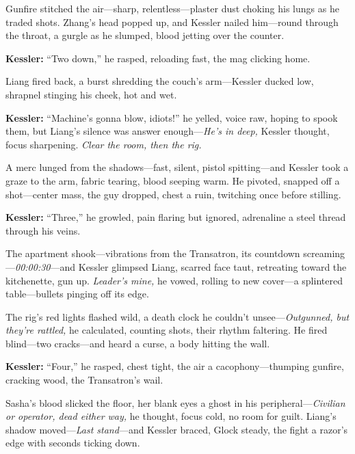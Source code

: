 \documentclass[12pt]{book}
\begin{document}
Gunfire stitched the air—sharp, relentless—plaster dust choking his lungs as he traded shots. Zhang’s head popped up, and Kessler nailed him—round through the throat, a gurgle as he slumped, blood jetting over the counter. 

\vspace{0.5em}
\textbf{Kessler:} “Two down,” he rasped, reloading fast, the mag clicking home.

Liang fired back, a burst shredding the couch’s arm—Kessler ducked low, shrapnel stinging his cheek, hot and wet. 

\vspace{0.5em}
\textbf{Kessler:} “Machine’s gonna blow, idiots!” he yelled, voice raw, hoping to spook them, but Liang’s silence was answer enough—\emph{He’s in deep,} Kessler thought, focus sharpening. \emph{Clear the room, then the rig.}

A merc lunged from the shadows—fast, silent, pistol spitting—and Kessler took a graze to the arm, fabric tearing, blood seeping warm. He pivoted, snapped off a shot—center mass, the guy dropped, chest a ruin, twitching once before stilling. 

\vspace{0.5em}
\textbf{Kessler:} “Three,” he growled, pain flaring but ignored, adrenaline a steel thread through his veins.

The apartment shook—vibrations from the Transatron, its countdown screaming—\emph{00:00:30}—and Kessler glimpsed Liang, scarred face taut, retreating toward the kitchenette, gun up. \emph{Leader’s mine,} he vowed, rolling to new cover—a splintered table—bullets pinging off its edge.

The rig’s red lights flashed wild, a death clock he couldn’t unsee—\emph{Outgunned, but they’re rattled,} he calculated, counting shots, their rhythm faltering. He fired blind—two cracks—and heard a curse, a body hitting the wall. 

\vspace{0.5em}
\textbf{Kessler:} “Four,” he rasped, chest tight, the air a cacophony—thumping gunfire, cracking wood, the Transatron’s wail.

Sasha’s blood slicked the floor, her blank eyes a ghost in his peripheral—\emph{Civilian or operator, dead either way,} he thought, focus cold, no room for guilt. Liang’s shadow moved—\emph{Last stand}—and Kessler braced, Glock steady, the fight a razor’s edge with seconds ticking down.

\vspace{1em}
\end{document}
